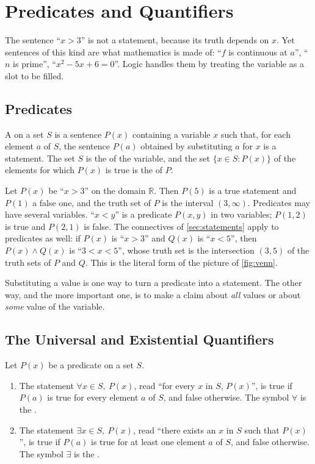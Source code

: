 \section{Predicates and Quantifiers}
\label{sec:quantifiers}

The sentence ``$x>3$'' is not a statement, because its truth depends on $x$. Yet sentences of this kind are what mathematics is made of: ``$f$ is continuous at $a$'', ``$n$ is prime'', ``$x^2-5x+6=0$''. Logic handles them by treating the variable as a slot to be filled.

\subsection{Predicates}

\begin{definition}[Predicate]
\label{def:predicate}
A  on a set $S$ is a sentence $P(x)$ containing a variable $x$ such that, for each element $a$ of $S$, the sentence $P(a)$ obtained by substituting $a$ for $x$ is a statement. The set $S$ is the  of the variable, and the set $\{x\in S: P(x)\}$ of the elements for which $P(x)$ is true is the  of $P$.
\end{definition}

Let $P(x)$ be ``$x>3$'' on the domain $\mathbb R$. Then $P(5)$ is a true statement and $P(1)$ a false one, and the truth set of $P$ is the interval $(3,\infty)$. Predicates may have several variables. ``$x<y$'' is a predicate $P(x,y)$ in two variables; $P(1,2)$ is true and $P(2,1)$ is false. The connectives of \cref{sec:statements} apply to predicates as well: if $P(x)$ is ``$x>3$'' and $Q(x)$ is ``$x<5$'', then $P(x)\wedge Q(x)$ is ``$3<x<5$'', whose truth set is the intersection $(3,5)$ of the truth sets of $P$ and $Q$. This is the literal form of the picture of \cref{fig:venn}.

Substituting a value is one way to turn a predicate into a statement. The other way, and the more important one, is to make a claim about \emph{all} values or about \emph{some} value of the variable.

\subsection{The Universal and Existential Quantifiers}

\begin{definition}[Quantifiers]
\label{def:quantifiers}
Let $P(x)$ be a predicate on a set $S$.
\begin{enumerate}
\item The statement $\forall x\in S,\ P(x)$, read ``for every $x$ in $S$, $P(x)$'', is true if $P(a)$ is true for every element $a$ of $S$, and false otherwise. The symbol $\forall$ is the .
\item The statement $\exists x\in S,\ P(x)$, read ``there exists an $x$ in $S$ such that $P(x)$'', is true if $P(a)$ is true for at least one element $a$ of $S$, and false otherwise. The symbol $\exists$ is the .
\end{enumerate}
\end{definition}

